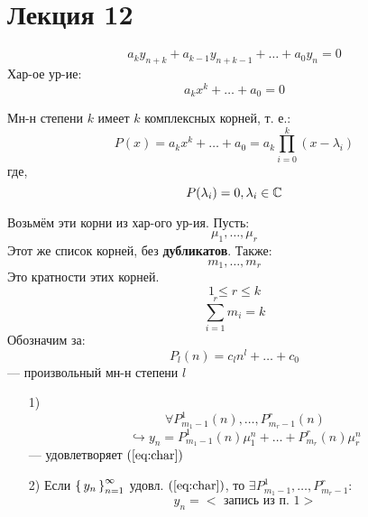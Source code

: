 \section{Лекция 12}
\begin{equation}
\label{eq:char}
a_k y_{n + k} + a_{k - 1} y_{n + k - 1} + \ldots + a_0 y_n = 0
\end{equation}
Хар-ое ур-ие:
\[
a_k x^{k} + \ldots + a_0 = 0
\]
\begin{theorem}
\label{th:base_algebra_th}
Мн-н степени $k$ имеет $k$ комплексных корней, т. е.:
\[
P(x) = a_k x^{k} + \ldots + a_0 = a_k \prod_{i = 0}^{k} (x - \lambda_i)
\]
где,
\[
P(\lambda_i) = 0, \lambda_i \in \mathbb{C}
\]
\end{theorem}
Возьмём эти корни из хар-ого ур-ия. Пусть:
\[
\mu_1, \ldots, \mu_r
\]
Этот же список корней, без \textbf{дубликатов}. Также:
\[
m_1, \ldots, m_r
\]
Это кратности этих корней.
\[
1 \leq r \leq k
\]
\[
\sum_{i = 1}^{r} m_i = k
\]
Обозначим за:
\[
P_l(n) = c_l n^{l} + \ldots + c_0 
\]
--- произвольный мн-н степени $l$
\begin{theorem}
\label{th:linear_recurrense_general_solution}
\begin{itemize}
  \item [1) ] \[
  \forall P_{m_1 - 1}^{1}(n), \ldots, P_{m_r - 1}^{r}(n)
  \]
  \[
 \hookrightarrow y_n = P_{m_1 - 1}^{1}(n) \mu_1^{n} + \ldots + P_{m_r}^{r}(n)\mu_r^{n}
  \]
  --- удовлетворяет $(\ref{eq:char})$
\item [2) ] Если $\set{y_n}_{n = 1}^{\infty}$ удовл. $(\ref{eq:char})$, то $\exists P_{m_1 - 1}^{1}, \ldots, P_{m_r - 1}^{r} \colon$
  \[
  y_n = < \text{ запись из п. 1} >
  \]
\end{itemize}
\end{theorem}
